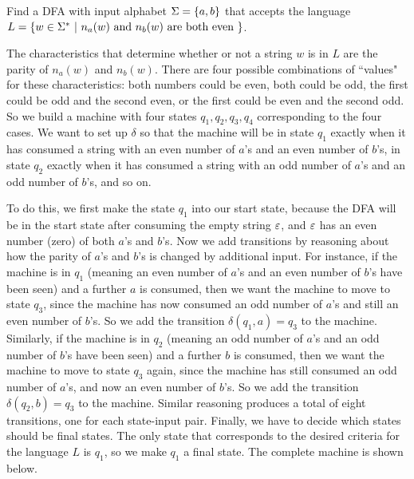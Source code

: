 \begin{example}
Find a DFA with input alphabet $\Sigma = \mbox{$\{a,b\}$}$ that accepts the language
$L= \{w \in \Sigma^* \ | \ n_a(w) \mbox{ and } n_b(w) \mbox{ are both even } \}$.

The characteristics that determine whether or not a string $w$ is in $L$ are the
parity of $n_a(w)$ and $n_b(w)$.  There are four possible combinations of
``values" for these characteristics: both numbers could be even, both could be
odd, the first could be odd and the second even, or the first could be even and
the second odd.  So we build a machine with four states $q_1, q_2, q_3, q_4$
corresponding to the four cases.  We want to set up $\delta$ so that the machine
will be in state $q_1$ exactly when it has consumed a string with an even number
of $a$'s and an even number of $b$'s, in state $q_2$ exactly when it has 
consumed a string with an
odd number of $a$'s and an odd number of $b$'s, and so on.  

To do this, we first make 
the state $q_1$ into our start state,
because the DFA will be in the start state after consuming the empty string
$\varepsilon$, and $\varepsilon$ has an even number (zero) of both $a$'s and $b$'s.  Now we
add transitions by reasoning about how the parity of $a$'s and $b$'s is changed
by additional input.  For instance, if the machine is in $q_1$ (meaning an even
number of $a$'s and an even number of $b$'s have been seen) and a further $a$ is
consumed, then we want the machine to move to state $q_3$, since the machine has
now consumed an odd number of $a$'s and still an even number of $b$'s.  So we add
the transition $\delta(q_1, a) = q_3$ to the machine.  Similarly, if the machine
is in $q_2$ (meaning an odd
number of $a$'s and an odd number of $b$'s have been seen) and a further $b$ is
consumed, then we want the machine to move to state $q_3$ again, since the 
machine has
still consumed an odd number of $a$'s, and now an even number of $b$'s.
So we add
the transition $\delta(q_2, b) = q_3$ to the machine.  Similar reasoning produces
a total of eight transitions, one for each state-input pair.  Finally, we have to
decide which states should be final states.  The only state that corresponds to
the desired criteria for the language $L$ is $q_1$, so we make $q_1$ a final
state.  The complete machine is shown below.




\end{example}

